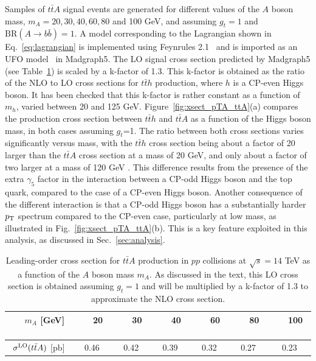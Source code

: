 \documentclass[preprintnumbers,superscriptaddress,nofootinbib,aps,prd,floatfix]{revtex4}
\newcommand{\pt}{p_{\rm{T}}}
\newcommand{\ttbar}{\ensuremath{t\bar{t}}}
\newcommand{\BR} {\ensuremath{\mathrm{BR}}}
\begin{document}
Samples of $\ttbar A$ signal events are generated for different values of the $A$ boson mass, $m_A = 20, 30,40, 60, 80$ and 100 GeV,
and assuming $g_t=1$ and $\BR(A \to b\bar{b})=1$. A model corresponding to the Lagrangian shown in Eq.~\ref{eq:lagrangian} 
is implemented using Feynrules 2.1~\cite{Alloul:2013bka} and is imported as an UFO  model~\cite{Degrande:2011ua} in {\sc Madgraph5}.  
The LO signal cross section predicted by  {\sc Madgraph5} (see Table~\ref{tab:sigma_ttA}) is scaled by a k-factor of 1.3. This k-factor is obtained 
as the ratio of the NLO to LO cross sections for $\ttbar h$ production, where $h$ is a CP-even Higgs boson. It has been checked that this k-factor
is rather constant as a function of $m_h$, varied between 20 and 125 GeV.
Figure~\ref{fig:xsect_pTA_ttA}(a) compares the production cross section between $\ttbar h$ and $\ttbar A$ as a function of the Higgs boson
mass, in both cases assuming $g_t$=1. The ratio between both cross sections varies significantly versus mass, with the $\ttbar h$ cross section
being about a factor of 20 larger than the $\ttbar A$ cross section at a mass of 20 GeV, and only about a factor of two larger at a mass of 120 GeV \cite{Frederix:2011zi}.
This difference results from the presence of the extra $\gamma_5$ factor in the interaction between a CP-odd Higgs boson and the top quark,
compared to the case of a CP-even Higgs boson.
Another consequence of the different interaction is that a CP-odd Higgs boson has a  substantially harder $\pt$ spectrum compared to the  CP-even case,
particularly at low mass, as illustrated in Fig.~\ref{fig:xsect_pTA_ttA}(b). This is a key feature exploited in this analysis, as discussed in
Sec.~\ref{sec:analysis}.

\begin{table}[h] 
\begin{center} 
\begin{tabular}{ccccccc} 
\hline\hline
$\quad$ $m_A$ [GeV] $\quad$ & $\quad$ 20 $\quad$ & $\quad$ 30 $\quad$ & $\quad$ 40 $\quad$ & $\quad$ 60 $\quad$ & $\quad$ 80 $\quad$ & $\quad$ 100 $\quad$ \\
\hline
$\sigma^{\rm LO}(\ttbar A)$ [pb] & 0.46 & 0.42 & 0.39 & 0.32 & 0.27 & 0.23 \\
\hline\hline
\end{tabular} 
\caption{\small {Leading-order cross section for $\ttbar A$ production in $pp$ collisions at $\sqrt{s}=14$ TeV as a function of 
the $A$ boson mass $m_A$. As discussed in the text, this LO cross section is obtained assuming $g_t=1$ and will be 
multiplied by a k-factor of 1.3 to approximate the NLO cross section.}}
\label{tab:sigma_ttA} 
\end{center} 
\end{table} 
\end{document}

